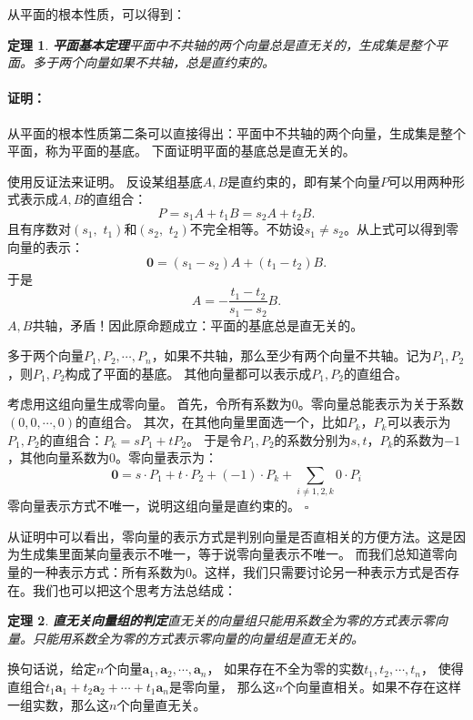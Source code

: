 \documentclass[12pt,UTF8]{ctexbook}
\newtheorem{tm}{定理}[section]
\renewenvironment{proof}{\paragraph{\textbf{证明：}}}{\hfill$\square$}
\begin{document}
从平面的根本性质，可以得到：
\begin{tm}{\textbf{平面基本定理}}\label{tm:0-0-20}
    平面中不共轴的两个向量总是直无关的，生成集是整个平面。多于两个向量如果不共轴，总是直约束的。
\end{tm}
\begin{proof}
    从平面的根本性质第二条可以直接得出：平面中不共轴的两个向量，生成集是整个平面，称为平面的基底。
    下面证明平面的基底总是直无关的。
    
    使用反证法来证明。
    反设某组基底$A,B$是直约束的，即有某个向量$P$可以用两种形式表示成$A,B$的直组合：
    $$ P = s_1A + t_1B = s_2A + t_2B. $$
    且有序数对$(s_1, \,\,t_1)$和$(s_2, \,\,t_2)$不完全相等。不妨设$s_1 \neq s_2$。从上式可以得到零向量的表示：
    $$ \mathbf{0} = (s_1 - s_2)A + (t_1 - t_2)B.$$
    于是
    $$ A = -\frac{t_1 - t_2}{s_1 - s_2} B.$$
    $A, B$共轴，矛盾！因此原命题成立：平面的基底总是直无关的。

    多于两个向量$P_1, P_2, \cdots , P_n$，如果不共轴，那么至少有两个向量不共轴。记为$P_1, P_2$，则$P_1, P_2$构成了平面的基底。
    其他向量都可以表示成$P_1, P_2$的直组合。
    
    考虑用这组向量生成零向量。
    首先，令所有系数为$0$。零向量总能表示为关于系数$(0,0,\cdots,0)$的直组合。
    其次，在其他向量里面选一个，比如$P_k$，$P_k$可以表示为$P_1, P_2$的直组合：$P_k = sP_1 + tP_2$。
    于是令$P_1,P_2$的系数分别为$s,t$，$P_k$的系数为$-1$，其他向量系数为$0$。零向量表示为：
    $$ \mathbf{0} = s\cdot P_1 + t\cdot P_2 + (-1)\cdot P_k + \sum_{i\neq 1,2,k} 0\cdot P_i$$
    零向量表示方式不唯一，说明这组向量是直约束的。
\end{proof}

从证明中可以看出，零向量的表示方式是判别向量是否直相关的方便方法。这是因为生成集里面某向量表示不唯一，等于说零向量表示不唯一。
而我们总知道零向量的一种表示方式：所有系数为$0$。这样，我们只需要讨论另一种表示方式是否存在。我们也可以把这个思考方法总结成：

\begin{tm}{\textbf{直无关向量组的判定}}\label{tm:0-0-25}
    直无关的向量组只能用系数全为零的方式表示零向量。只能用系数全为零的方式表示零向量的向量组是直无关的。
\end{tm}

换句话说，给定$n$个向量$\mathbf{a}_1, \mathbf{a}_2, \cdots , \mathbf{a}_n$，
如果存在不全为零的实数$t_1, t_2, \cdots , t_n$，
使得直组合$t_1\mathbf{a}_1 + t_2\mathbf{a}_2 + \cdots + t_1\mathbf{a}_n$是零向量，
那么这$n$个向量直相关。如果不存在这样一组实数，那么这$n$个向量直无关。
\end{document}
